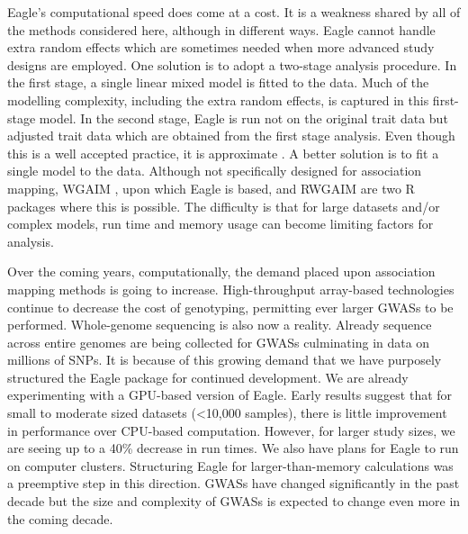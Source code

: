 \documentclass{nature}
\begin{document}
Eagle's computational speed does come at a cost. It is a weakness shared by all of the methods considered here, although in different ways. 
Eagle cannot handle extra random effects which are sometimes needed when more advanced study designs are employed. One solution 
is to adopt a two-stage analysis procedure. In the first stage, a single linear mixed model is fitted to the data. Much of the modelling complexity, 
including the extra random effects, is 
captured in this first-stage model. In the second stage, Eagle is run not on the original trait data but adjusted trait data which are obtained from the first stage analysis. Even though this is a well accepted practice, it is approximate \cite{gogel2018comparison}.  A better solution is to fit a single model to the data. 
Although not specifically designed for association mapping,
WGAIM \cite{verbyla2007analysis}, upon which Eagle is based, and RWGAIM \cite{verbyla2012rwgaim}  are two R packages where this is possible. The difficulty is that for large datasets and/or complex 
models,  run time and memory usage can become limiting factors for analysis. 


Over the coming years, computationally, the demand placed upon association mapping methods is going to increase. 
High-throughput array-based technologies continue to decrease the cost of genotyping, permitting ever larger GWASs to be performed. 
Whole-genome sequencing is also now a reality. Already sequence across entire genomes are being collected for GWASs \cite{gudbjartsson2015large, long2017whole}
culminating in data on millions of SNPs. It is because of this growing demand that 
we have purposely structured the Eagle package for continued development. We are already experimenting with a GPU-based version of Eagle. 
Early results suggest that for small to moderate sized datasets (<10,000 samples), there is little improvement in performance over CPU-based 
computation.  However, for larger study sizes, we are seeing up to a 40\% decrease in run times.  
We also have plans for Eagle to run on computer clusters. Structuring Eagle for larger-than-memory calculations was a 
preemptive step in this direction. GWASs have changed significantly in the past decade but the size and complexity of GWASs is expected 
to change even more in the coming decade. 
\end{document}
